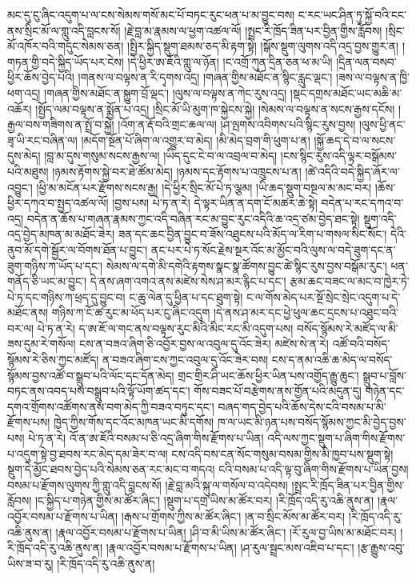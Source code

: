 \documentclass{article}
\begin{document}
མང་དུ་ངུ་ཞིང་འདུག་པ་ལ་ངས་སེམས་གསོ་མང་པོ་བཏང་རུང་ཕན་པ་མ་བྱུང་བས། ང་རང་ཡང་ཤིན་ཏུ་སྐྱོ་བའི་ངང་ནས་སྲིང་མོ་ལ་གླུ་འདི་བླངས་སོ། །རྗེ་བླ་མ་རྣམས་ལ་ཕྱག་འཚལ་ལོ། །སྤྲང་རི་ཁྲོད་ཟིན་པར་བྱིན་གྱིས་རློབས། །སྲིང་མོ་འཁོར་བའི་གདུང་སེམས་ཅན། །སྤྱིར་སྐྱིད་སྡུག་ཐམས་ཅད་མི་རྟག་སྟེ། །སྒོས་སྡུག་ལུགས་འདི་འདྲ་བྱས་གྱུར་ན། །གཏན་གྱི་བདེ་སྐྱིད་ཡོད་པར་ངེས། །དེ་ཕྱིར་ཨ་ཇོའི་གླུ་ལ་ཉོན། །ང་འགྲོ་ཀུན་དྲིན་ཅན་ཕ་མ་ཡི། །དྲིན་ལན་བསབ་ཕྱིར་ཆོས་བྱེད་པའི། །གནས་ལ་བལྟས་ན་རི་དྭགས་འདྲ། །གཞན་གྱིས་མཐོང་ན་སྙིང་རླུང་ལྡང་། །ཟས་ལ་བལྟས་ན་ཁྱི་ཕག་འདྲ། །གཞན་གྱིས་མཐོང་ན་སྐྱུག་བྲོ་ལྡང་། །ལུས་ལ་བལྟས་ན་ཀེང་རུས་འདྲ། །སྡང་དགྲས་མཐོང་ཡང་མཆི་མ་འཆོར། །སྤྱོད་ལམ་བལྟས་ན་སྨྱོན་པ་འདྲ། །སྲིང་མོ་ཡི་མུག་ཁ་སྐྱེངས་སྐྱེ། །སེམས་ལ་བལྟས་ན་སངས་རྒྱས་དངོས། །རྒྱལ་བས་གཟིགས་ན་སྤྲོ་བ་སྐྱེ། །འོག་ན་རྡོ་བའི་གྲང་ཆལ་ལ། །ཤ་ལྤགས་འབིགས་པའི་སྙིང་རུས་བྱས། །ལུས་ཕྱི་ནང་ཟྭ་ཡི་རང་བཞིན་ལ། །མདོག་སྔོན་པོ་ཞིག་ལ་འགྱུར་བ་མེད། །མི་མེད་བྲག་གི་ཕུག་པ་ན། །སྐྱོ་ཆད་དེ་བ་ལ་སངས་དུས་མེད། །བླ་མ་དུས་གསུམ་སངས་རྒྱས་ལ། །ཡིད་དུང་ངེ་བ་ལ་འབྲལ་བ་མེད། །ངས་སྙིང་རུས་འདི་ལྟར་བསྒོམས་པའི་མཐུས། །ཉམས་རྟོགས་སྐྱེ་བར་ཐེ་ཚོམ་མེད། །ཉམས་དང་རྟོགས་པ་འཁྲུངས་པ་ན། །ཚེ་འདིའི་བདེ་སྐྱིད་ཞོར་ལ་འབྱུང་། །ཕྱི་མ་མངོན་པར་རྫོགས་སངས་རྒྱ། །དེ་ཕྱིར་སྲིང་མོ་པེ་ཏ་ལྕམ། །ཡི་ཆད་སྡུག་བསྔལ་མ་མང་བར། །ཆོས་ཕྱིར་དཀའ་བ་སྤྱད་འཚལ་ལོ། །བྱས་པས། པེ་ཏ་ན་རེ། དེ་ལྟར་ཡིན་ན་དག་ངོ་མཚར་ཆེ་སྟེ། བདེན་པ་རང་དཀའ་བ་འདྲ། བདེན་ན་ཆོས་པ་གཞན་རྣམས་ཀྱང་འདི་བཞིན་རང་མ་བྱུང་རུང་འདིའི་ཆ་འདྲ་ཙམ་བྱེད་ཐང་སྟེ། སྡུག་འདི་འདྲ་བྱེད་མཁན་མ་མཐོང་ཟེར། ཟན་དང་ཆང་བྱིན་བྱུང་བ་ཟོས་འཐུངས་པའི་མོད་ལ་རིག་པ་གསལ་སིང་སོང་། དེའི་ནུབ་མོ་དགེ་སྦྱོར་ལ་བོགས་ཐོན་པ་བྱུང་། ནང་པར་པེ་ཏ་སོང་རྗེས་སྔར་འོང་མ་མྱོང་བའི་ལུས་ལ་བདེ་ཟུག་དང་ན་ཟུག་གཉིས་ཀ་ཡོད་པ་དང་། སེམས་ལ་དགེ་མི་དགེའི་རྟགས་སྣང་སྣ་ཚོགས་བྱུང་ཚེ་སྙིང་རུས་བྱས་བསྒོམ་རུང་། ཕན་གནོད་ཅི་ཡང་མ་བྱུང་། དེ་ནས་ཞག་འགའ་ནས་མཛེས་སེས་ཤ་མར་རྙིང་པ་དང་། རྩམ་ཆང་བཟང་ལ་མང་བ་ཁྱེར་ཏེ་པེ་ཏ་དང་གཉིས་ཀ་ཕྲད་དུ་བྱུང་བ། ང་ཆུ་ལེན་དུ་ཕྱིན་པ་དང་ཐུག་སྟེ། ང་ལ་གོས་མེད་པར་སྔོ་སྲེང་སྲེང་འདུག་པ་དེ་མཐོང་ནས། གཉིས་ཀ་ངོ་ཚ་རུང་མ་ཕོད་པར་ངུ་ཞིང་འདུག །དེ་ནས་ཤ་མར་དང་ཕྱེ་ཕུལ་ཆང་དྲངས་པ་འཐུང་བའི་བར་ལ། པེ་ཏ་ན་རེ། ད་ཨ་ཇོ་ལ་གང་ནས་བལྟས་རུང་མིའི་མིང་རང་མི་འདུག་པས། བསོད་སྙོམས་རེ་མཛོད་ལ་མི་ཟས་དུམ་རེ་གསོལ། ངས་ན་བཟའ་ཞིག་ཅི་འབྱོར་བྱས་ལ་འབུལ་དུ་འོང་ཟེར། མཛེས་སེ་ན་རེ། འཚོ་བའི་བསོད་སྙོམས་རེ་ཅིས་ཀྱང་མཛོད། ན་བཟའ་ཞིག་ངས་ཀྱང་འབུལ་དུ་འོང་ཟེར་བས། ངས་ད་ནམ་འཆི་ཆ་མེད་ལ་བསོད་སྙོམས་བྱས་འཚོ་བ་སྒྲུབ་པའི་ལོང་དང་དོན་མེད། གྲང་གྲིར་ཤི་ཡང་ཆོས་ཕྱིར་ཡིན་པས་འགྱོད་རྒྱུ་ཆུང་། སྒྲུབ་པ་བློས་བཏང་ནས་འབད་པས་བསྒྲུབ་པའི་ལྟོ་ཡོག་ཚད་དང་། གོས་བཟང་པོ་བརྩེགས་ནས་གྱོན་པའི་མདུན་དུ། གཉེན་དང་དགའ་གྲོགས་འཚོགས་ནས་བག་མེད་ཀྱི་བཟའ་བཏུང་དང་། བཞད་གད་བྱེད་པའི་ཆོས་དེས་ངའི་བསམ་པ་མི་རྫོགས་པས། ཁྱེད་ཀྱིས་གོས་དང་འོང་མཁན་ཡང་མི་དགོས། ཁ་ལ་ཡང་མི་ཉན་པས་བསོད་སྙོམས་ཀྱང་མི་བྱེད་བྱས་པས། པེ་ཏ་ན་རེ། འོ་ན་ཨ་ཇོའི་བསམ་པ་ཅི་འདྲ་ཞིག་གིས་རྫོགས་པ་ཡིན། འདི་ལས་ཀྱང་སྡུག་པ་ཞིག་གིས་རྫོགས་པ་འདུག་སྟེ་བྱ་ཐབས་རང་མེད་དམ་ཟེར་བ་ལ། ངས་འདི་བས་ངན་སོང་གསུམ་བསམ་གྱིས་མི་ཁྱབ་པས་སྡུག་སྟེ། སྡུག་དེ་མྱོང་ཐབས་བྱེད་པའི་སེམས་ཅན་རང་མང་བ་གདའ། ངའི་བསམ་པ་འདི་ལྟ་བུ་ཞིག་གིས་རྫོགས་པ་ཡིན་བྱས། བསམ་པ་རྫོགས་ལུགས་ཀྱི་གླུ་འདི་བླངས་སོ། །རྗེ་བླ་མའི་སྐུ་ལ་གསོལ་བ་འདེབས། །སྤྲང་རི་ཁྲོད་ཟིན་པར་བྱིན་གྱིས་རློབས། །ང་སྐྱིད་པ་གཉེན་གྱིས་མ་ཚོར་ཞིང་། །སྡུག་པ་དགྲ་ཡིས་མ་ཚོར་བར། །རི་ཁྲོད་འདི་རུ་འཆི་ནུས་ན། །རྣལ་འབྱོར་བསམ་པ་རྫོགས་པ་ཡིན། །རྒས་པ་གྲོགས་ཀྱིས་མ་ཚོར་ཞིང་། །ན་བ་སྲིང་མོས་མ་ཚོར་བར། །རི་ཁྲོད་འདི་རུ་འཆི་ནུས་ན། །རྣལ་འབྱོར་བསམ་པ་རྫོགས་པ་ཡིན། །ཤི་བ་མི་ཡིས་མ་ཚོར་ཞིང་། །རོ་རུལ་བྱ་ཡིས་མ་མཐོང་བར། །རི་ཁྲོད་འདི་རུ་འཆི་ནུས་ན། །རྣལ་འབྱོར་བསམ་པ་རྫོགས་པ་ཡིན། །ཤ་རུལ་སྦྲང་མས་འཇིབ་པ་དང་། །རྩ་རྒྱུས་འབུ་ཡིས་ཟ་བ་རུ། །རི་ཁྲོད་འདི་རུ་འཆི་ནུས་ན། 
\end{document}
